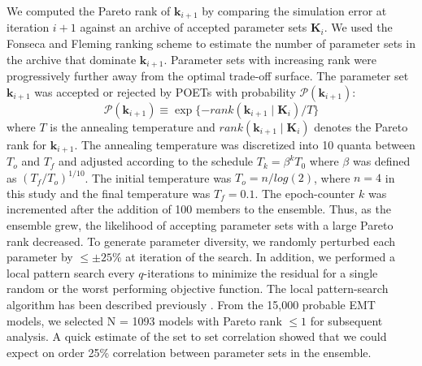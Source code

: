 \documentclass[12pt]{article}
\begin{document}
We computed the Pareto rank of $\mathbf{k}_{i+1}$ by comparing the simulation error at iteration $i+1$ against an archive of accepted parameter sets $\mathbf{K}_{i}$.
We used the Fonseca and Fleming ranking scheme \cite{fonseca1993genetic} to estimate the number of parameter sets in the archive that dominate
$\mathbf{k}_{i+1}$. Parameter sets with increasing rank were progressively further away from the optimal trade-off surface.
The parameter set $\mathbf{k}_{i+1}$ was accepted or rejected by POETs with probability $\mathcal{P}\left(\mathbf{k}_{i+1}\right)$:
\begin{equation}\label{eqn_costMOSA}
\mathcal{P}(\mathbf{k}_{i+1}) \equiv \exp{\{-rank\left(\mathbf{k}_{i+1} \mid \mathbf{K}_{i} \right)/T\}}
\end{equation}
where $T$ is the annealing temperature and $rank\left(\mathbf{k}_{i+1} \mid \mathbf{K}_{i} \right)$ denotes the Pareto rank for $\mathbf{k}_{i+1}$.
The annealing temperature was discretized into 10 quanta between $T_{o}$ and $T_{f}$ and adjusted according to the schedule
$T_k = \beta^k T_0$ where $\beta$ was defined as $\left({T_{f}}/{T_{o}}\right)^{1/10}$.
The initial temperature was $T_{o} = \mathit{n}/log(2)$, where $n = 4$ in this study and the final temperature was $T_{f} = 0.1$.
The epoch-counter $k$ was incremented after the addition of 100 members to the ensemble.
Thus, as the ensemble grew, the likelihood of accepting parameter sets with a large Pareto rank decreased.
To generate parameter diversity, we randomly perturbed each parameter by $\leq\pm25\%$ at iteration of the search.
In addition, we performed a local pattern search every $q$-iterations to minimize the residual for a single random or the worst performing objective function.
The local pattern-search algorithm has been described previously \cite{gadkar2003cybernetic}.
From the 15,000 probable EMT models, we selected N = 1093 models with Pareto rank $\leq{1}$ for subsequent analysis.
A quick estimate of the set to set correlation showed that we could expect on order 25\% correlation between parameter sets in the ensemble.
\end{document}
